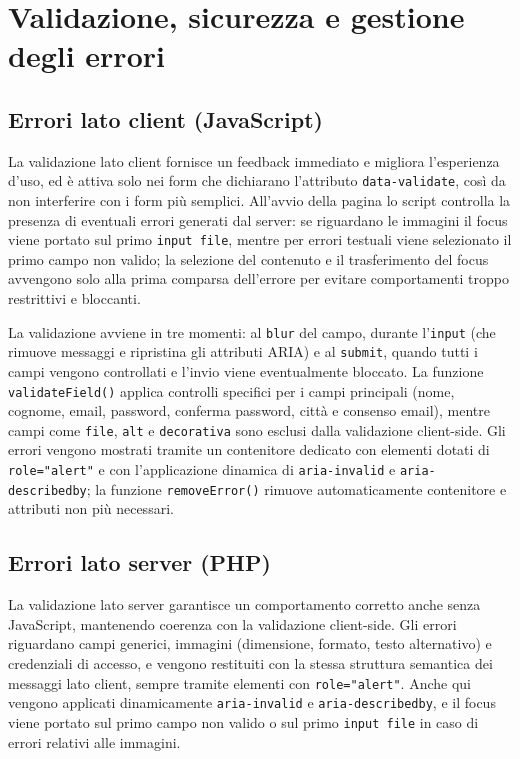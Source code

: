 \documentclass[a4paper,12pt]{article}
\begin{document}
\section{Validazione, sicurezza e gestione degli errori}
\label{sviluppo:validazione}

\subsection{Errori lato client (JavaScript)}
La validazione lato client fornisce un feedback immediato e migliora l’esperienza d’uso, ed è attiva solo nei form che dichiarano l’attributo \texttt{data-validate}, così da non interferire con i form più semplici. All’avvio della pagina lo script controlla la presenza di eventuali errori generati dal server: se riguardano le immagini il focus viene portato sul primo \texttt{input file}, mentre per errori testuali viene selezionato il primo campo non valido; la selezione del contenuto e il trasferimento del focus avvengono solo alla prima comparsa dell’errore per evitare comportamenti troppo restrittivi e bloccanti.

La validazione avviene in tre momenti: al \texttt{blur} del campo, durante l’\texttt{input} (che rimuove messaggi e ripristina gli attributi ARIA) e al \texttt{submit}, quando tutti i campi vengono controllati e l’invio viene eventualmente bloccato. La funzione \texttt{validateField()} applica controlli specifici per i campi principali (nome, cognome, email, password, conferma password, città e consenso email), mentre campi come \texttt{file}, \texttt{alt} e \texttt{decorativa} sono esclusi dalla validazione client-side. Gli errori vengono mostrati tramite un contenitore dedicato con elementi dotati di \texttt{role="alert"} e con l’applicazione dinamica di \texttt{aria-invalid} e \texttt{aria-describedby}; la funzione \texttt{removeError()} rimuove automaticamente contenitore e attributi non più necessari.

\subsection{Errori lato server (PHP)}

La validazione lato server garantisce un comportamento corretto anche senza JavaScript, mantenendo coerenza con la validazione client-side. Gli errori riguardano campi generici, immagini (dimensione, formato, testo alternativo) e credenziali di accesso, e vengono restituiti con la stessa struttura semantica dei messaggi lato client, sempre tramite elementi con \texttt{role="alert"}. Anche qui vengono applicati dinamicamente \texttt{aria-invalid} e \texttt{aria-describedby}, e il focus viene portato sul primo campo non valido o sul primo \texttt{input file} in caso di errori relativi alle immagini.
\end{document}
